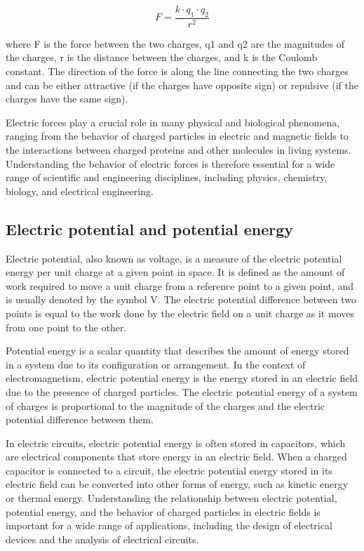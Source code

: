\documentclass{article}
\begin{document}
\[F=\frac{k\cdot q_1\cdot q_2}{r^2}\]

where F is the force between the two charges, q1 and q2 are the magnitudes of
the charges, r is the distance between the charges, and k is the Coulomb
constant. The direction of the force is along the line connecting the two
charges and can be either attractive (if the charges have opposite sign) or
repulsive (if the charges have the same sign).

Electric forces play a crucial role in many physical and biological phenomena,
ranging from the behavior of charged particles in electric and magnetic fields
to the interactions between charged proteins and other molecules in living
systems. Understanding the behavior of electric forces is therefore essential
for a wide range of scientific and engineering disciplines, including physics,
chemistry, biology, and electrical engineering.
\subsection{Electric potential and potential energy} %
\label{ssub:Electric potential and potential energy}
Electric potential, also known as voltage, is a measure of the electric
potential energy per unit charge at a given point in space. It is defined as
the amount of work required to move a unit charge from a reference point to a
given point, and is usually denoted by the symbol V. The electric potential
difference between two points is equal to the work done by the electric field
on a unit charge as it moves from one point to the other.

Potential energy is a scalar quantity that describes the amount of energy
stored in a system due to its configuration or arrangement. In the context of
electromagnetism, electric potential energy is the energy stored in an electric
field due to the presence of charged particles. The electric potential energy
of a system of charges is proportional to the magnitude of the charges and the
electric potential difference between them.

In electric circuits, electric potential energy is often stored in capacitors,
which are electrical components that store energy in an electric field. When a
charged capacitor is connected to a circuit, the electric potential energy
stored in its electric field can be converted into other forms of energy, such
as kinetic energy or thermal energy. Understanding the relationship between
electric potential, potential energy, and the behavior of charged particles in
electric fields is important for a wide range of applications, including the
design of electrical devices and the analysis of electrical circuits.
\end{document}
